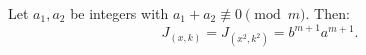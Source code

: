 Let $a_1, a_2$ be integers with $a_1 + a_2 \not\equiv 0 \pmod{m}$. Then:
$$J_{(x, k)} = J_{(x^2, k^2)} = b^{m+1} a^{m+1}.$$

